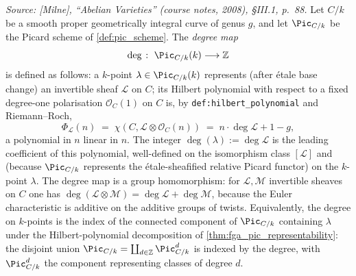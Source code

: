 \begin{definition}
  \textit{Source: [Milne], ``Abelian Varieties'' (course notes, 2008),
  \S III.1, p.~88.}
  Let \(C/k\) be a smooth proper geometrically integral curve of genus
  \(g\), and let \(\Pic_{C/k}\) be the Picard scheme of
  \cref{def:pic_scheme}. The \emph{degree map}
  \[
    \deg \;\colon\; \Pic_{C/k}(k) \longrightarrow \mathbb{Z}
  \]
  is defined as follows: a \(k\)-point \(\lambda \in \Pic_{C/k}(k)\)
  represents (after \'etale base change) an invertible sheaf
  \(\mathcal{L}\) on \(C\); its Hilbert polynomial with respect to a fixed
  degree-one polarisation \(\mathcal{O}_C(1)\) on \(C\) is, by
  \texttt{def:hilbert\_polynomial} and Riemann--Roch,
  \[
    \Phi_{\mathcal{L}}(n)
    \;=\; \chi(C, \mathcal{L} \otimes \mathcal{O}_C(n))
    \;=\; n \cdot \deg \mathcal{L} + 1 - g,
  \]
  a polynomial in \(n\) linear in \(n\). The integer
  \(\deg(\lambda) := \deg \mathcal{L}\) is the leading coefficient of
  this polynomial, well-defined on the isomorphism class
  \([\mathcal{L}]\) and (because \(\Pic_{C/k}\) represents the
  \'etale-sheafified relative Picard functor) on the \(k\)-point
  \(\lambda\). The degree map is a group homomorphism: for
  \(\mathcal{L}, \mathcal{M}\) invertible sheaves on \(C\) one has
  \(\deg(\mathcal{L} \otimes \mathcal{M}) = \deg \mathcal{L} + \deg \mathcal{M}\),
  because the Euler characteristic is additive on the additive groups of
  twists. Equivalently, the degree on \(k\)-points is the index of the
  connected component of \(\Pic_{C/k}\) containing \(\lambda\) under the
  Hilbert-polynomial decomposition of
  \cref{thm:fga_pic_representability}: the disjoint union
  \(\Pic_{C/k} = \coprod_{d \in \mathbb{Z}} \Pic^d_{C/k}\) is indexed by
  the degree, with \(\Pic^d_{C/k}\) the component representing classes
  of degree \(d\).
\end{definition}


